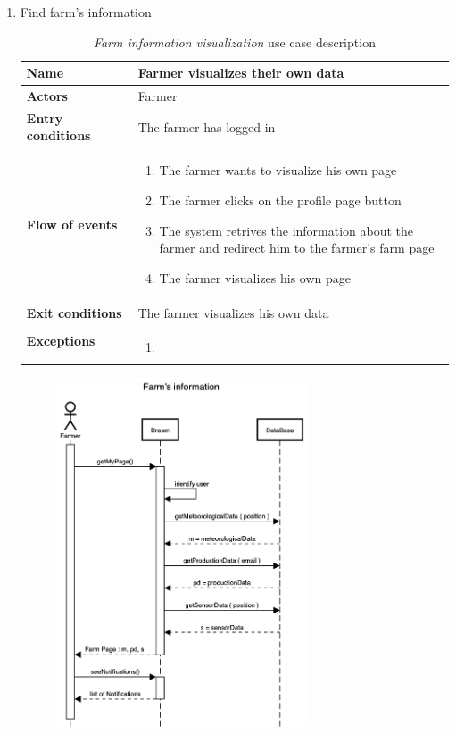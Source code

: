 \begin{enumerate}
    \item Find farm’s information
    \begin{longtable}{p{0.26\linewidth}p{0.75\linewidth}}
        \toprule
        \textbf{Name} & \textbf{Farmer visualizes their own data} \\
        \midrule
        \textbf{Actors} & Farmer \\
        \midrule
        \textbf{Entry conditions} & The farmer has logged in\\
        \midrule
        \textbf{Flow of events} & 
        \begin{enumerate}
            \item The farmer wants to visualize his own page
            \item The farmer clicks on the profile page button
            \item The system retrives the information about the farmer and redirect him to the farmer's farm page
            \item The farmer visualizes his own page
        \end{enumerate} \\
        \midrule
        \textbf{Exit conditions} & The farmer visualizes his own data\\
        \midrule
        \textbf{Exceptions} & 
        \begin{enumerate}
            \item
        \end{enumerate}\\
        \bottomrule
        \caption{\emph{Farm information visualization} use case description}
    \end{longtable}
    \begin{figure}[H]
        \begin{center}
        \includegraphics[width=0.7\textwidth]{sequence/FarmInformation.png}

\end{center}
\end{figure}
\end{enumerate}
